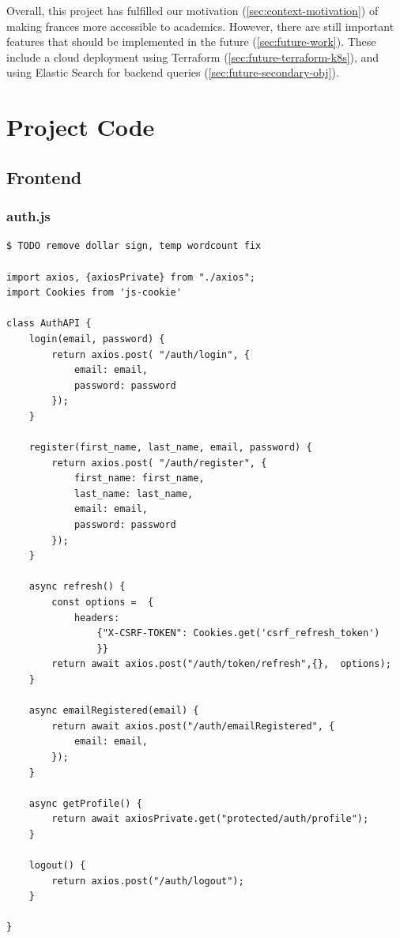 \documentclass[12pt, letterpaper]{article}
\begin{document}
\begin{flushleft}
Overall, this project has fulfilled our motivation (\ref{sec:context-motivation}) of making frances more accessible to academics. However, there are still important features that should be implemented in the future (\ref{sec:future-work}). These include a cloud deployment using Terraform (\ref{sec:future-terraform-k8s}), and using Elastic Search for backend queries (\ref{sec:future-secondary-obj}).
\end{flushleft}

{}


\appendix
\section{Project Code}\label{appendix:project-code}
\subsection{Frontend}

\subsubsection{auth.js}\label{appendix:auth.js}

\begin{verbatim}
$ TODO remove dollar sign, temp wordcount fix

import axios, {axiosPrivate} from "./axios";
import Cookies from 'js-cookie'

class AuthAPI {
    login(email, password) {
        return axios.post( "/auth/login", {
            email: email,
            password: password
        });
    }

    register(first_name, last_name, email, password) {
        return axios.post( "/auth/register", {
            first_name: first_name,
            last_name: last_name,
            email: email,
            password: password
        });
    }

    async refresh() {
        const options =  {
            headers:
                {"X-CSRF-TOKEN": Cookies.get('csrf_refresh_token')
                }}
        return await axios.post("/auth/token/refresh",{},  options);
    }

    async emailRegistered(email) {
        return await axios.post("/auth/emailRegistered", {
            email: email,
        });
    }

    async getProfile() {
        return await axiosPrivate.get("protected/auth/profile");
    }

    logout() {
        return axios.post("/auth/logout");
    }

}
\end{verbatim}
\end{document}
